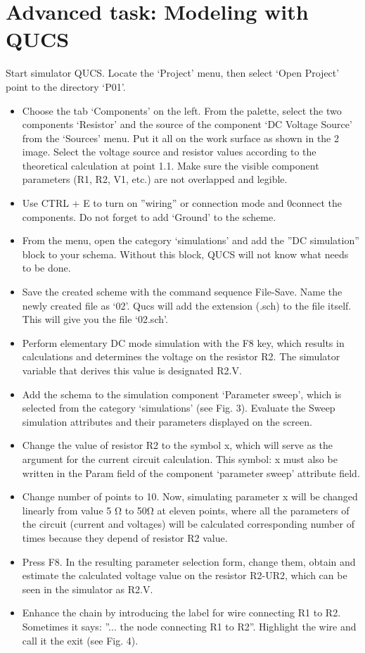 \documentclass{report}
\begin{document}
\section{Advanced task: Modeling with QUCS}
Start simulator QUCS. Locate the ‘Project’ menu, then select ‘Open Project’ point to
the directory ‘P01’.
\begin{itemize}
\item  Choose the tab ‘Components’ on the left. From the palette, select the two components ‘Resistor’ and the source of the component ‘DC Voltage Source’ from the ‘Sources’ menu. Put it all on the work surface as shown in the 2 image. Select the voltage source and resistor values according to the theoretical calculation at point 1.1. Make sure the visible component parameters (R1, R2, V1, etc.) are not overlapped and legible.
    \item  Use CTRL + E to turn on ”wiring” or connection mode and 0connect the components. Do not forget to add ‘Ground’ to the scheme.
\end{itemize}


\begin{itemize}
\item From the menu, open the category ‘simulations’ and add the ”DC simulation” block to
your schema. Without this block, QUCS will not know what needs to be done.
\item Save the created scheme with the command sequence File-Save. Name the newly created
file as ‘02’. Qucs will add the extension (.sch) to the file itself. This will give you the
file ‘02.sch’.
\item Perform elementary DC mode simulation with the F8 key, which results in calculations
and determines the voltage on the resistor R2. The simulator variable that derives this
value is designated R2.V.
\item Add the schema to the simulation component ‘Parameter sweep’, which is selected from
the category ‘simulations’ (see Fig. 3). Evaluate the Sweep simulation attributes and
their parameters displayed on the screen.

\item Change the value of resistor R2 to the symbol x, which will serve as the argument for the
current circuit calculation. This symbol: x must also be written in the Param field of the
component ‘parameter sweep’ attribute field.
\item Change number of points to 10. Now, simulating parameter x will be changed linearly
from value 5 Ω to 50Ω at eleven points, where all the parameters of the circuit (current
and voltages) will be calculated corresponding number of times because they depend of
resistor R2 value.
\item Press F8. In the resulting parameter selection form, change them, obtain and estimate
the calculated voltage value on the resistor R2-UR2, which can be seen in the simulator
as R2.V.
\item Enhance the chain by introducing the label for wire connecting R1 to R2. Sometimes it
says: ”... the node connecting R1 to R2”. Highlight the wire and call it the exit (see Fig.
4).

 \end{itemize}
 
\end{document}
